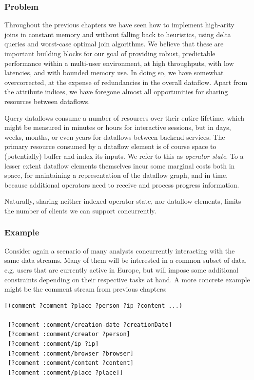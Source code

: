 \documentclass[../catalog.tex]{subfiles}
\begin{document}
\subsubsection{Problem}

Throughout the previous chapters we have seen how to implement
high-arity joins in constant memory and without falling back to
heuristics, using delta queries and worst-case optimal join
algorithms. We believe that these are important building blocks for
our goal of providing robust, predictable performance within a
multi-user environment, at high throughputs, with low latencies, and
with bounded memory use. In doing so, we have somewhat overcorrected,
at the expense of redundancies in the overall dataflow. Apart from the
attribute indices, we have foregone almost all opportunities for
sharing resources between dataflows.

Query dataflows consume a number of resources over their entire
lifetime, which might be measured in minutes or hours for interactive
sessions, but in days, weeks, months, or even years for dataflows
between backend services. The primary resource consumed by a dataflow
element is of course space to (potentially) buffer and index its
inputs. We refer to this as \emph{operator state}. To a lesser extent
dataflow elements themselves incur some marginal costs both in space,
for maintaining a representation of the dataflow graph, and in time,
because additional operators need to receive and process progress
information.

Naturally, sharing neither indexed operator state, nor dataflow
elements, limits the number of clients we can support concurrently.

\subsubsection{Example}

Consider again a scenario of many analysts concurrently interacting
with the same data streams. Many of them will be interested in a
common subset of data, e.g. users that are currently active in Europe,
but will impose some additional constraints depending on their
respective tasks at hand. A more concrete example might be the comment
stream from previous chapters:

\begin{verbatim}
[(comment ?comment ?place ?person ?ip ?content ...)

 [?comment :comment/creation-date ?creationDate]
 [?comment :comment/creator ?person]
 [?comment :comment/ip ?ip]
 [?comment :comment/browser ?browser]
 [?comment :comment/content ?content]
 [?comment :comment/place ?place]]
\end{verbatim}
\end{document}
